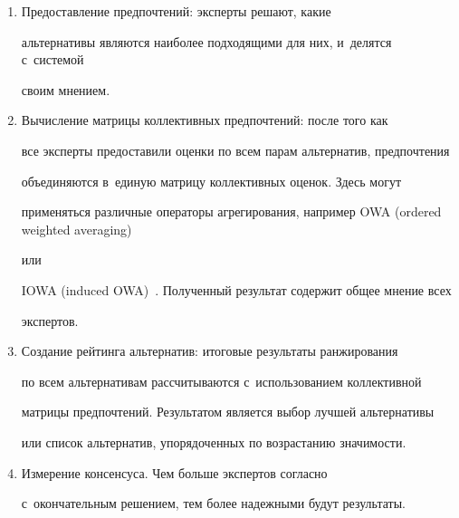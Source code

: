   \begin{enumerate}[1.]


  \item Предоставление предпочтений: эксперты решают, какие 


альтернативы являются наиболее подходящими для них, и~делятся с~системой 


своим мнением. 


  \item  Вычисление матрицы коллективных предпочтений: после того как 


все эксперты предоставили оценки по всем парам альтернатив, предпочтения 


объединяются в~единую матрицу коллективных оценок. Здесь могут 


применяться различные операторы агрегирования, например OWA (ordered weighted averaging)


или 


IOWA (induced OWA)~\cite{10-g}. Полученный результат содержит общее мнение всех 


экспертов.


  \item Создание рейтинга альтернатив: итоговые результаты ранжирования 


по всем альтернативам рассчитываются с~использованием коллективной 


матрицы предпочтений. Результатом является выбор лучшей альтернативы 


или список альтернатив, упорядоченных по возрастанию значимости.


  \item Измерение консенсуса. Чем больше экспертов согласно 


с~окончательным решением, тем более надежными будут результаты. 


  \end{enumerate}


  


